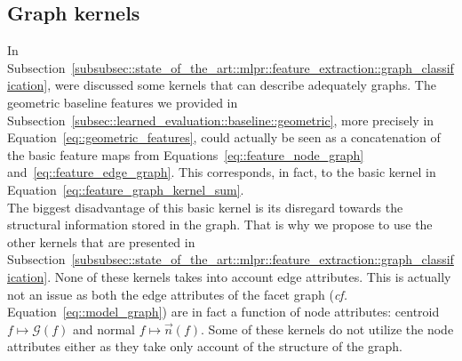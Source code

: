     \subsection{Graph kernels}
        \label{subsec::learned_evaluation::richer_features::graph}
        In Subsection~\ref{subsubsec::state_of_the_art::mlpr::feature_extraction::graph_classification}, were discussed some kernels that can describe adequately graphs.
        The geometric baseline features we provided in Subsection~\ref{subsec::learned_evaluation::baseline::geometric}, more precisely in Equation~\ref{eq::geometric_features}, could actually be seen as a concatenation of the basic feature maps from Equations~\ref{eq::feature_node_graph} and~\ref{eq::feature_edge_graph}.
        This corresponds, in fact, to the basic kernel in Equation~\ref{eq::feature_graph_kernel_sum}.\\

        The biggest disadvantage of this basic kernel is its disregard towards the structural information stored in the graph.
        That is why we propose to use the other kernels that are presented in Subsection~\ref{subsubsec::state_of_the_art::mlpr::feature_extraction::graph_classification}.
        None of these kernels takes into account edge attributes.
        This is actually not an issue as both the edge attributes of the facet graph (\textit{cf.} Equation~\ref{eq::model_graph}) are in fact a function of node attributes: centroid \(f \mapsto \mathscr{G}\left(f\right)\) and normal \(f \mapsto \vec{n}\left(f\right)\).
        Some of these kernels do not utilize the node attributes either as they take only account of the structure of the graph.\\

